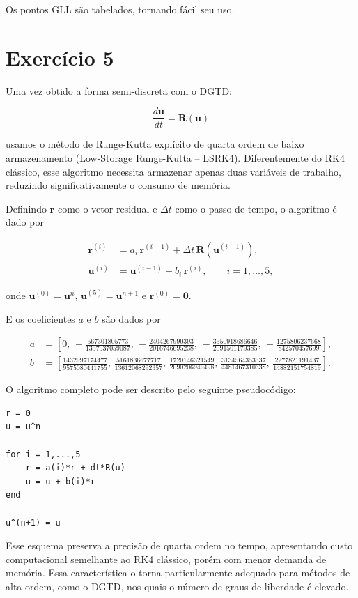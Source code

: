 Os pontos GLL são tabelados, tornando fácil seu uso.

\section{Exercício 5}

Uma vez obtido a forma semi-discreta com o DGTD:

\[ \frac{d\mathbf{u}}{dt} = \mathbf{R}(\mathbf{u}) \]

\noindent usamos o método de
Runge-Kutta explícito de quarta ordem de baixo armazenamento
(Low-Storage Runge-Kutta -- LSRK4). Diferentemente do RK4 clássico,
esse algoritmo necessita armazenar apenas duas variáveis de trabalho,
reduzindo significativamente o consumo de memória.

Definindo $\mathbf{r}$ como o vetor residual e
$\Delta t$ como o passo de tempo, o algoritmo é dado por

\begin{align}
\mathbf{r}^{(i)} &=
a_i\,\mathbf{r}^{(i-1)}
+
\Delta t\,\mathbf{R}\!\left(\mathbf{u}^{(i-1)}\right),
\\
\mathbf{u}^{(i)}
&=
\mathbf{u}^{(i-1)}
+
b_i\,\mathbf{r}^{(i)},
\qquad i=1,\ldots,5,
\end{align}

onde $\mathbf{u}^{(0)}=\mathbf{u}^n$,
$\mathbf{u}^{(5)}=\mathbf{u}^{n+1}$ e
$\mathbf{r}^{(0)}=\mathbf{0}$.

E os coeficientes $a$ e $b$ são dados por 

\begin{align}
a &=
\left[
0,\,
-\frac{567301805773}{1357537059087},\,
-\frac{2404267990393}{2016746695238},\,
-\frac{3550918686646}{2091501179385},\,
-\frac{1275806237668}{842570457699}
\right],
\\
b &=
\left[
\frac{1432997174477}{9575080441755},\,
\frac{5161836677717}{13612068292357},\,
\frac{1720146321549}{2090206949498},\,
\frac{3134564353537}{4481467310338},\,
\frac{2277821191437}{14882151754819}
\right].
\end{align}

O algoritmo completo pode ser descrito pelo seguinte pseudocódigo:

\begin{verbatim}
r = 0
u = u^n

for i = 1,...,5
    r = a(i)*r + dt*R(u)
    u = u + b(i)*r
end

u^(n+1) = u
\end{verbatim}

Esse esquema preserva a precisão de quarta ordem no tempo,
apresentando custo computacional semelhante ao RK4 clássico, porém
com menor demanda de memória. Essa característica o torna
particularmente adequado para métodos de alta ordem, como o DGTD,
nos quais o número de graus de liberdade é elevado.

